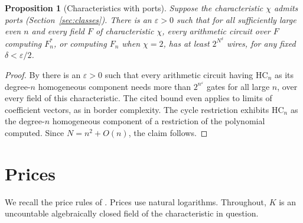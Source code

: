 \documentclass[11pt]{article}
\newtheorem{proposition}[theorem]{Proposition}
\theoremstyle{remark}
\newcommand{\HC}{\mathrm{HC}}
\begin{document}
\begin{proposition}[Characteristics with ports]\label{prop:ports}
Suppose the characteristic \(\chi\) admits ports
(Section~\ref{sec:classes}). There is an
\(\varepsilon>0\) such that for all sufficiently large even \(n\) and
every field \(F\) of characteristic \(\chi\), every arithmetic circuit
over \(F\) computing \(F^*_n\), or computing \(F_n\) when \(\chi=2\), has
at least \(2^{N^{\delta}}\) wires, for any fixed
\(\delta<\varepsilon/2\).
\end{proposition}

\begin{proof}
By \cite[Theorem 12.2]{hc} there is an \(\varepsilon>0\) such that every
arithmetic circuit having \(\HC_n\) as its degree-\(n\) homogeneous
component needs more than \(2^{n^\varepsilon}\) gates for all large
\(n\), over every field of this characteristic. The cited bound even
applies to limits of coefficient vectors, as in border complexity. The
cycle restriction exhibits \(\HC_n\) as the degree-\(n\) homogeneous
component of a restriction of the polynomial computed. Since
\(N=n^2+O(n)\), the claim follows.
\end{proof}

\section{Prices}\label{sec:prices}
We recall the price rules of \cite{hc}. Prices use natural logarithms. Throughout, \(K\) is an
uncountable algebraically closed field of the characteristic in
question.
\end{document}
